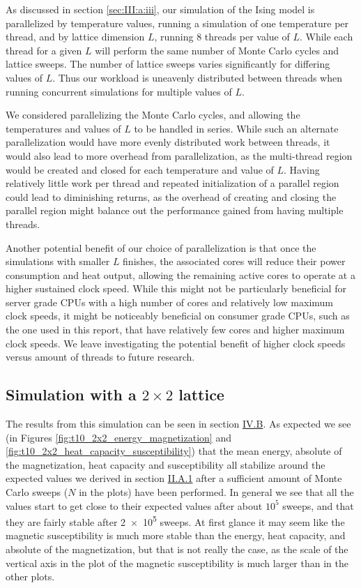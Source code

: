 \documentclass[reprint,english,notitlepage]{revtex4-1}  %
\begin{document}
As discussed in section \ref{sec:III:a:iii}, our simulation of the Ising model is parallelized by temperature values, running a simulation of one temperature per thread, and by lattice dimension \(L\), running \(8\) threads per value of \(L\). While each thread for a given \(L\) will perform the same number of Monte Carlo cycles and lattice sweeps. The number of lattice sweeps varies significantly for differing values of \(L\). Thus our workload is uneavenly distributed between threads when running concurrent simulations for multiple values of \(L\).

We considered parallelizing the Monte Carlo cycles, and allowing the temperatures and values of \(L\) to be handled in series. While such an alternate parallelization would have more evenly distributed work between threads, it would also lead to more overhead from parallelization, as the multi-thread region would be created and closed for each temperature and value of \(L\). Having relatively little work per thread and repeated initialization of a parallel region could lead to diminishing returns, as the overhead of creating and closing the parallel region might balance out the performance gained from having multiple threads.

Another potential benefit of our choice of parallelization is that once the simulations with smaller \(L\) finishes, the associated cores will reduce their power consumption and heat output, allowing the remaining active cores to operate at a higher sustained clock speed. While this might not be particularly beneficial for server grade CPUs with a high number of cores and relatively low maximum clock speeds, it might be noticeably beneficial on consumer grade CPUs, such as the one used in this report, that have relatively few cores and higher maximum clock speeds. We leave investigating the potential benefit of higher clock speeds versus amount of threads to future research.

\subsection{Simulation with a $2\times 2$ lattice} \label{sec:V:B}

The results from this simulation can be seen in section \hyperref[sec:IV:B]{IV.B}. As expected we see (in Figures \ref{fig:t10_2x2_energy_magnetization} and \ref{fig:t10_2x2_heat_capacity_susceptibility}) that the mean energy, absolute of the magnetization, heat capacity and susceptibility all stabilize around the expected values we derived in section \hyperref[sec:II:A:i]{II.A.1} after a sufficient amount of Monte Carlo sweeps ($N$ in the plots) have been performed. In general we see that all the values start to get close to their expected values after about $10^5$ sweeps, and that they are fairly stable after \num{2e5} sweeps. At first glance it may seem like the magnetic susceptibility is much more stable than the energy, heat capacity, and absolute of the magnetization, but that is not really the case, as the scale of the vertical axis in the plot of the magnetic susceptibility is much larger than in the other plots.
\end{document}
